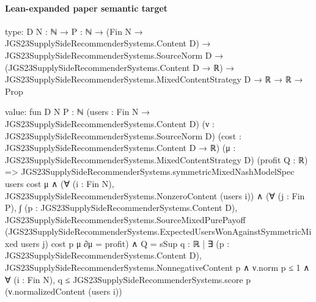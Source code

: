 \documentclass[10pt]{article}
\begin{document}
\paragraph{Lean-expanded paper semantic target}
\begin{ReviewVerbatim}
type:
{D N : ℕ} →
  {P : ℕ} →
    (Fin N → JGS23SupplySideRecommenderSystems.Content D) →
      JGS23SupplySideRecommenderSystems.SourceNorm D →
        (JGS23SupplySideRecommenderSystems.Content D → ℝ) →
          JGS23SupplySideRecommenderSystems.MixedContentStrategy D → ℝ → ℝ → Prop

value:
fun {D N P : ℕ} (users : Fin N → JGS23SupplySideRecommenderSystems.Content D)
    (ν : JGS23SupplySideRecommenderSystems.SourceNorm D) (cost : JGS23SupplySideRecommenderSystems.Content D → ℝ)
    (μ : JGS23SupplySideRecommenderSystems.MixedContentStrategy D) (profit Q : ℝ) =>
  JGS23SupplySideRecommenderSystems.symmetricMixedNashModelSpec users cost μ ∧
    (∀ (i : Fin N), JGS23SupplySideRecommenderSystems.NonzeroContent (users i)) ∧
      (∀ (j : Fin P),
          ∫ (p : JGS23SupplySideRecommenderSystems.Content D),
              JGS23SupplySideRecommenderSystems.SourceMixedPurePayoff
                (JGS23SupplySideRecommenderSystems.ExpectedUsersWonAgainstSymmetricMixed users j) cost p μ ∂μ =
            profit) ∧
        Q =
          sSup
            {q : ℝ |
              ∃ (p : JGS23SupplySideRecommenderSystems.Content D),
                JGS23SupplySideRecommenderSystems.NonnegativeContent p ∧
                  ν.norm p ≤ 1 ∧
                    ∀ (i : Fin N), q ≤ JGS23SupplySideRecommenderSystems.score p (ν.normalizedContent (users i))}
\end{ReviewVerbatim}
\end{document}
